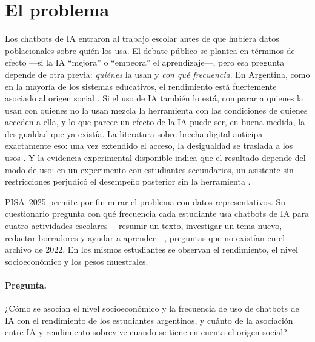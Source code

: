 \documentclass[11pt,a4paper]{article}
\begin{document}
\section{El problema}\label{sec:problema}

Los chatbots de IA entraron al trabajo escolar antes de que hubiera datos poblacionales sobre quién los usa. El debate público se plantea en términos de efecto ---si la IA \enquote{mejora} o \enquote{empeora} el aprendizaje---, pero esa pregunta depende de otra previa: \emph{quiénes} la usan y \emph{con qué frecuencia}. En Argentina, como en la mayoría de los sistemas educativos, el rendimiento está fuertemente asociado al origen social \parencite{sirin2005}. Si el uso de IA también lo está, comparar a quienes la usan con quienes no la usan mezcla la herramienta con las condiciones de quienes acceden a ella, y lo que parece un efecto de la IA puede ser, en buena medida, la desigualdad que ya existía. La literatura sobre brecha digital anticipa exactamente eso: una vez extendido el acceso, la desigualdad se traslada a los usos \parencite{hargittai2002}. Y la evidencia experimental disponible indica que el resultado depende del modo de uso: en un experimento con estudiantes secundarios, un asistente sin restricciones perjudicó el desempeño posterior sin la herramienta \parencite{bastani2025}.

PISA~2025 permite por fin mirar el problema con datos representativos. Su cuestionario pregunta con qué frecuencia cada estudiante usa chatbots de IA para cuatro actividades escolares ---resumir un texto, investigar un tema nuevo, redactar borradores y ayudar a aprender---, preguntas que no existían en el archivo de 2022. En los mismos estudiantes se observan el rendimiento, el nivel socioeconómico y los pesos muestrales.

\paragraph{Pregunta.} ¿Cómo se asocian el nivel socioeconómico y la frecuencia de uso de chatbots de IA con el rendimiento de los estudiantes argentinos, y cuánto de la asociación entre IA y rendimiento sobrevive cuando se tiene en cuenta el origen social?
\end{document}
